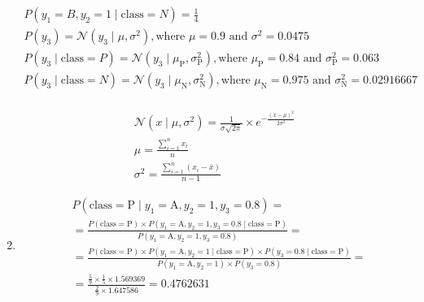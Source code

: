 \documentclass[12pt,a4paper]{article}
\begin{document}
\begin{enumerate}
\begin{gather*}
		      P(y_1 = B, y_2 = 1 \mid \text{class} = N) = \frac{1}{4}                                                                                                        \\
		      P(y_3) = \mathcal{N}(y_3 \mid \mu, \sigma^2), \text{where } \mu = 0.9 \text{ and } \sigma^2 = 0.0475                                                                                                                                                 \\
		      P(y_3 \mid \text{class} = P) = \mathcal{N}(y_3 \mid \mu_{\text{P}},
		      \sigma^2_{\text{P}}), \text{where } \mu_{\text{P}} = 0.84 \text{ and } \sigma^2_{\text{P}} = 0.063 \\
		      P(y_3 \mid \text{class} = N) = \mathcal{N}(y_3 \mid \mu_{\text{N}}, \sigma^2_{\text{N}}),
		      \text{where } \mu_{\text{N}} = 0.975 \text{ and } \sigma^2_{\text{N}} = 0.02916667 \\
	      \end{gather*}

	      \begin{gather*}
		      \mathcal{N}(x \mid \mu, \sigma^2) = \frac{1}{\sigma \sqrt{2\pi}} \times e^{-\frac{(x - \mu)^2}{2 \sigma^2 }} \\
		      \mu = \frac{\sum_{i=1}^{n} x_i}{n} \\
		      \sigma^2 = \frac{\sum_{i=1}^{n} (x_i - \bar{x})}{n-1}
	      \end{gather*}
	      \pagebreak

	\item
	      \begingroup
	      \addtolength\jot{8pt}
	      \begin{align*}
		       & P(\text{class}=\text{P} \mid y_1=\text{A},y_2=1,y_3=0.8) =                                                                                                                          \\
		       & = \frac{P(\text{class}=\text{P}) \times P(y_1=\text{A}, y_2=1, y_3=0.8 \mid \text{class}=\text{P})}{P(y_1=\text{A}, y_2=1, y_3=0.8)} =                                              \\
		       & = \frac{P(\text{class}=\text{P}) \times P(y_1=\text{A}, y_2=1 \mid \text{class}=\text{P}) \times P(y_3=0.8 \mid \text{class}=\text{P})}{P(y_1=\text{A}, y_2=1) \times P(y_3=0.8)} = \\
		       & = \frac{\frac{5}{9} \times \frac{1}{5} \times 1.569369}{\frac{2}{9} \times 1.647586} = 0.4762631
	      \end{align*}


\end{enumerate}
\end{document}
